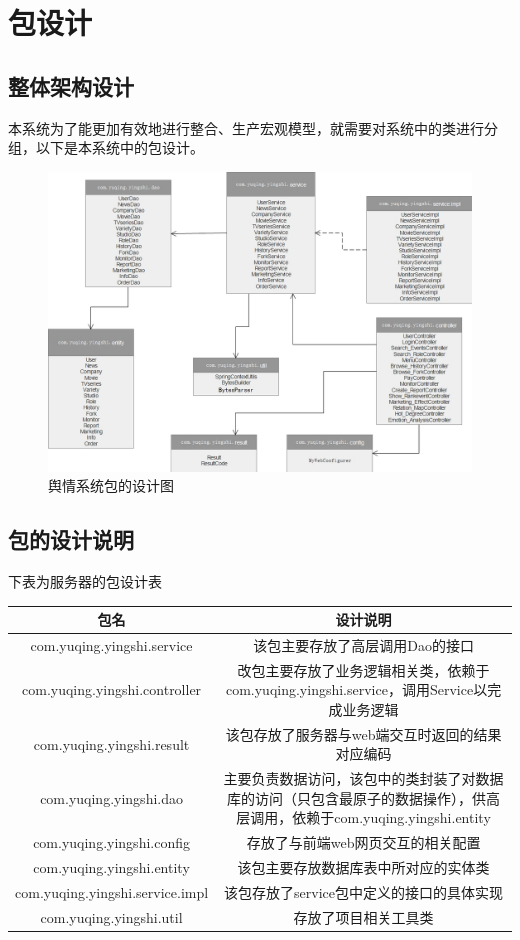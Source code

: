 \section{包设计}
\subsection{整体架构设计}
本系统为了能更加有效地进行整合、生产宏观模型，就需要对系统中的类进行分组，以下是本系统中的包设计。
\begin{figure}[!htbp]
	\centering
	\includegraphics[scale=0.4]{image/o2.png}
	\caption{舆情系统包的设计图}
\end{figure}

\subsection{包的设计说明}
下表为服务器的包设计表
\begin{tabular}{c c|} 
包名 & 
\multicolumn{2}{c}{设计说明} \\ 
\hline 
com.yuqing.yingshi.service & 该包主要存放了高层调用Dao的接口\\
com.yuqing.yingshi.controller & 改包主要存放了业务逻辑相关类，依赖于com.yuqing.yingshi.service，调用Service以完成业务逻辑\\
com.yuqing.yingshi.result& 该包存放了服务器与web端交互时返回的结果对应编码\\
com.yuqing.yingshi.dao&主要负责数据访问，该包中的类封装了对数据库的访问（只包含最原子的数据操作），供高层调用，依赖于com.yuqing.yingshi.entity\\
com.yuqing.yingshi.config& 存放了与前端web网页交互的相关配置\\
com.yuqing.yingshi.entity&该包主要存放数据库表中所对应的实体类\\
com.yuqing.yingshi.service.impl&该包存放了service包中定义的接口的具体实现\\
com.yuqing.yingshi.util&存放了项目相关工具类\\
\end{tabular}

